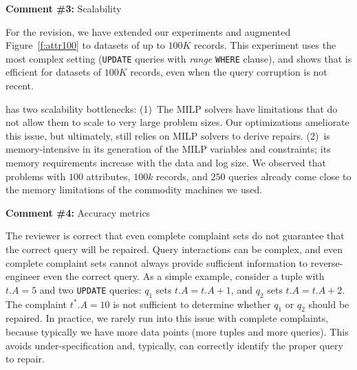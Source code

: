 
\noindent
\textbf{Comment \#3:} Scalability 
\begin{quote}
\end{quote}

For the revision, we have extended our experiments and augmented
Figure~\ref{f:attr100} to datasets of up to $100K$ records. This experiment
uses the most complex setting (\texttt{UPDATE} queries with \textit{range}
\texttt{WHERE} clause), and shows that \sys is efficient for datasets of
$100K$ records, even when the query corruption is not recent.

\sys has two scalability bottlenecks: (1)~The MILP solvers have limitations
that do not allow them to scale to very large problem sizes. Our optimizations
ameliorate this issue, but ultimately, \sys still relies on MILP solvers to
derive repairs. (2)~\sys is memory-intensive in its generation of the MILP
variables and constraints; its memory requirements increase with the data and
log size. We observed that problems with $100$ attributes, $100k$ records, and
$250$ queries already come close to the memory limitations of the commodity
machines we used.



\comskip

\noindent
\textbf{Comment \#4:} Accuracy metrics
\begin{quote}
\end{quote}

The reviewer is correct that even complete complaint sets do not guarantee
that the correct query will be repaired. Query interactions can be complex,
and even complete complaint sets cannot always provide sufficient information
to reverse-engineer even the correct query. As a simple example, consider a
tuple with $t.A=5$ and two \texttt{UPDATE} queries: $q_1$ sets $t.A=t.A+1$,
and $q_2$ sets $t.A=t.A+2$. The complaint $t^*.A=10$ is not sufficient to
determine whether $q_1$ or $q_2$ should be repaired. In practice, we rarely
run into this issue with complete complaints, because typically we have more
data points (more tuples and more queries). This avoids under-specification
and, typically, \sys can correctly identify the proper query to repair.


